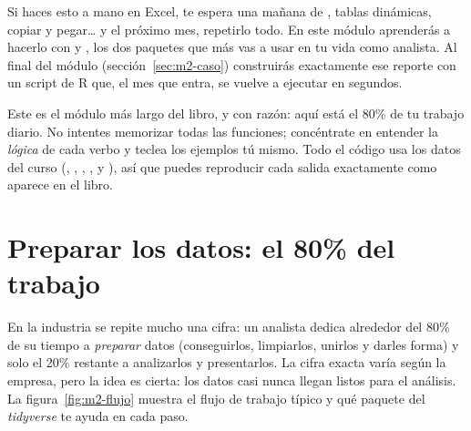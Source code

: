 Si haces esto a mano en Excel, te espera una mañana de ,
tablas dinámicas, copiar y pegar\ldots{} y el próximo mes, repetirlo todo. En
este módulo aprenderás a hacerlo con  y , los
dos paquetes que más vas a usar en tu vida como analista. Al final del módulo
(sección~\ref{sec:m2-caso}) construirás exactamente ese reporte con un script
de R que, el mes que entra, se vuelve a ejecutar en segundos.

Este es el módulo más largo del libro, y con razón: aquí está el 80\% de tu
trabajo diario. No intentes memorizar todas las funciones; concéntrate en
entender la \emph{lógica} de cada verbo y teclea los ejemplos tú mismo. Todo
el código usa los datos del curso (,
, , ,
 y ), así que puedes
reproducir cada salida exactamente como aparece en el libro.

\section{Preparar los datos: el 80\% del trabajo}
\label{sec:m2-motivacion}

En la industria se repite mucho una cifra: un analista dedica alrededor del
80\% de su tiempo a \emph{preparar} datos (conseguirlos, limpiarlos, unirlos y
darles forma) y solo el 20\% restante a analizarlos y presentarlos. La cifra
exacta varía según la empresa, pero la idea es cierta: los datos casi nunca
llegan listos para el análisis. La figura~\ref{fig:m2-flujo} muestra el flujo
de trabajo típico y qué paquete del \emph{tidyverse} te ayuda en cada paso.

